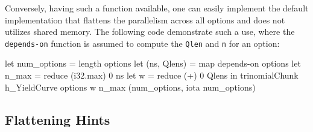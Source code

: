 \documentclass[a4paper,11pt]{article}
\begin{document}
Conversely, having such a function available, one can easily implement
the default implementation that flattens the parallelism across all
options and does not utilizes shared memory.  The following code
demonstrate such a use, where the {\tt depends-on} function is assumed
to compute the {\tt Qlen} and {\tt n} for an option:

\begin{fancycode}
let num_options = length options
let (ns, Qlens) = map depends-on options
let n_max = reduce (i32.max) 0 ns
let w     = reduce (+) 0 Qlens
in  trinomialChunk h_YieldCurve options w n_max (num_options, iota num_options)
\end{fancycode}

\subsection{Flattening Hints}
\end{document}
